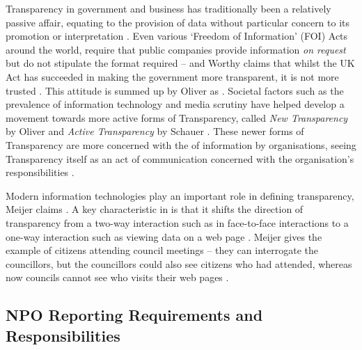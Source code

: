 Transparency in government and business has traditionally been a relatively passive affair, equating to the provision of data without particular concern to its promotion or interpretation \cite{schauer_transparency_2011, oliver_what_2004}. Even various `Freedom of Information' (FOI) Acts around the world, require that public companies provide information \textit{on request} but do not stipulate the format required -- and Worthy claims that whilst the UK Act has succeeded in making the government more transparent, it is not more trusted \cite{hood_transparency_2006-1, _freedom_2000, worthy_more_2010}. This attitude is summed up by Oliver as  \cite{oliver_what_2004}. Societal factors such as the prevalence of information technology and media scrutiny have helped develop a movement towards more active forms of Transparency, called \textit{New Transparency} by Oliver and \textit{Active Transparency} by Schauer \cite{oliver_what_2004, schauer_transparency_2011}. These newer forms of Transparency are more concerned with the  of information by organisations, seeing Transparency itself as an act of communication concerned with the organisation's responsibilities \cite{schauer_transparency_2011, oliver_what_2004}.

Modern information technologies play an important role in defining transparency, Meijer claims  \cite{meijer_understanding_2009}. A key characteristic in  is that it shifts the direction of transparency from a two-way interaction such as in face-to-face interactions to a one-way interaction such as viewing data on a web page \cite{meijer_understanding_2009}. Meijer gives the example of citizens attending council meetings -- they can interrogate the councillors, but the councillors could also see citizens who had attended, whereas now councils cannot see who visits their web pages \cite{meijer_understanding_2009}.

\subsection{NPO Reporting Requirements and Responsibilities}
